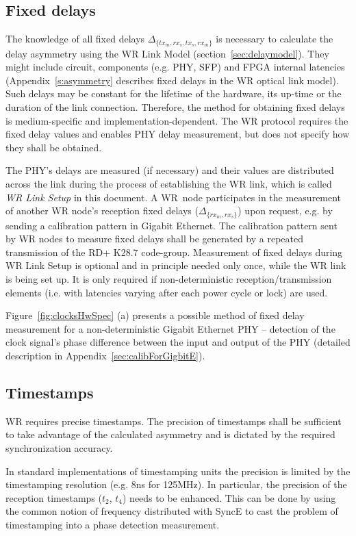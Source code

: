 \documentclass[a4paper, 12pt]{article}
\begin{document}
\subsection{Fixed delays}
\label{sec:fixedDelays}
The knowledge of all fixed delays $\Delta_{\{tx_m, rx_s, tx_s, rx_m\}}$ is necessary to calculate 
the delay asymmetry using the WR Link Model (section~\ref{sec:delaymodel}). They might include circuit, 
components (e.g. PHY, SFP) and FPGA internal latencies (Appendix~\ref{s:asymmetry} describes 
fixed delays in the WR optical link model). Such delays may be constant for 
the lifetime of the hardware, its up-time or the duration of the link connection. Therefore, 
the method for obtaining fixed delays is medium-specific and implementation-dependent. 
The WR protocol requires the fixed delay values and enables PHY delay
measurement, but does not specify how they shall be obtained.

The PHY's delays are measured (if necessary) and their values are distributed across the link during 
the process of establishing the WR link, which is called \textit{WR Link Setup} in this document. 
A WR~node participates in the measurement of another 
WR node's reception fixed delays ($\Delta_{\{rx_m, rx_s\}}$) upon request, e.g. by sending 
a calibration pattern in Gigabit Ethernet. The calibration pattern sent by WR nodes to measure 
fixed delays shall be generated by a repeated transmission of the RD+ K28.7 code-group. 
Measurement of fixed delays during WR Link Setup is optional and in principle needed only once, 
while the WR link is being set up. It is only required if non-deterministic reception/transmission 
elements (i.e. with latencies varying after each power cycle or lock) are used.

Figure~\ref{fig:clocksHwSpec} (a) presents a possible method of fixed delay measurement for a 
non-deterministic Gigabit Ethernet PHY -- detection of the clock signal's phase difference between 
the input and output of the PHY (detailed description in Appendix~\ref{sec:calibForGigbitE}). 


\subsection{Timestamps}
\label{sec:timestamps}

WR requires precise timestamps. 
The precision of timestamps shall be sufficient to take advantage of the calculated asymmetry
and is dictated by the required synchronization accuracy. 

In standard implementations of timestamping units the precision is limited by 
the timestamping resolution (e.g. 8ns for 125MHz). 
In particular, the precision of the reception timestamps ($t_2$, $t_4$) needs to be enhanced. 
This can be done by using the common notion of frequency distributed with SyncE to cast the 
problem of timestamping into a phase detection measurement.
\end{document}
